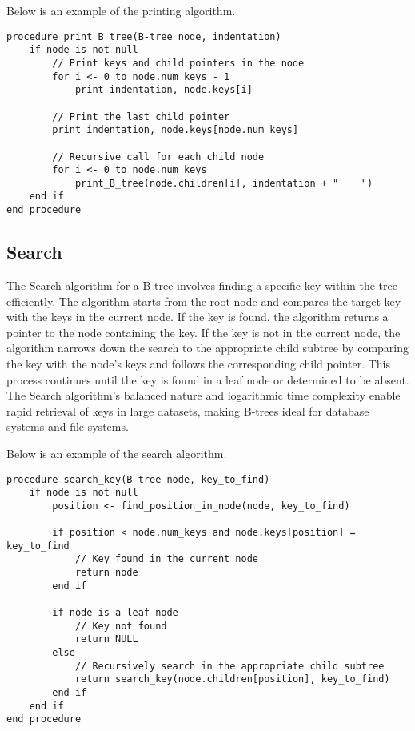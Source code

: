 \begin{highlight}

Below is an example of the printing algorithm.

\horizontalline

\begin{verbatim}
procedure print_B_tree(B-tree node, indentation)
    if node is not null
        // Print keys and child pointers in the node
        for i <- 0 to node.num_keys - 1
            print indentation, node.keys[i]

        // Print the last child pointer
        print indentation, node.keys[node.num_keys]

        // Recursive call for each child node
        for i <- 0 to node.num_keys
            print_B_tree(node.children[i], indentation + "    ")
    end if
end procedure
\end{verbatim}
    
\end{highlight}

\subsection*{Search}

The Search algorithm for a B-tree involves finding a specific key within the tree efficiently. The algorithm starts from the root node and compares the target key with the keys in the current node. If the 
key is found, the algorithm returns a pointer to the node containing the key. If the key is not in the current node, the algorithm narrows down the search to the appropriate child subtree by comparing the 
key with the node's keys and follows the corresponding child pointer. This process continues until the key is found in a leaf node or determined to be absent. The Search algorithm's balanced nature and 
logarithmic time complexity enable rapid retrieval of keys in large datasets, making B-trees ideal for database systems and file systems.

\begin{highlight}

Below is an example of the search algorithm.

\horizontalline

\begin{verbatim}
procedure search_key(B-tree node, key_to_find)
    if node is not null
        position <- find_position_in_node(node, key_to_find)

        if position < node.num_keys and node.keys[position] = key_to_find
            // Key found in the current node
            return node
        end if

        if node is a leaf node
            // Key not found
            return NULL
        else
            // Recursively search in the appropriate child subtree
            return search_key(node.children[position], key_to_find)
        end if
    end if
end procedure
\end{verbatim}
    
\end{highlight}

